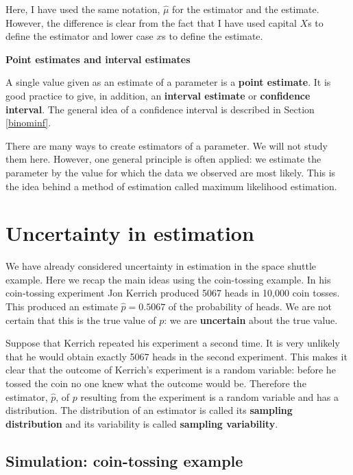 \documentclass[
  british,
  11pt,
  openany, a4paper]{book}
\begin{document}
Here, I have used the same notation, \(\hat{\mu}\) for the estimator and the estimate. However, the difference is clear from the fact that I have used capital \(X\)s to define the estimator and lower case \(x\)s to define the estimate.

\textbf{Point estimates and interval estimates}

A single value given as an estimate of a parameter is a \textbf{point estimate}. It is good practice to give, in addition, an \textbf{interval estimate} or \textbf{confidence interval}. The general idea of a confidence interval is described in Section \ref{binominf}.

There are many ways to create estimators of a parameter. We will not study them here. However, one general principle is often applied: we estimate the parameter by the value for which the data we observed are most likely. This is the idea behind a method of estimation called maximum likelihood estimation.

\section{Uncertainty in estimation}\label{uncertainty-in-estimation}

We have already considered uncertainty in estimation in the space shuttle example. Here we recap the main ideas using the coin-tossing example. In his coin-tossing experiment Jon Kerrich produced 5067 heads in 10,000 coin tosses. This produced an estimate \(\hat{p}=0.5067\) of the probability of heads. We are not certain that this is the true value of \(p\): we are \textbf{uncertain} about the true value.

Suppose that Kerrich repeated his experiment a second time. It is very unlikely that he would obtain exactly 5067 heads in the second experiment. This makes it clear that the outcome of Kerrich's experiment is a random variable: before he tossed the coin no one knew what the outcome would be. Therefore the estimator, \(\hat{p}\), of \(p\) resulting from the experiment is a random variable and has a distribution. The distribution of an estimator is called its \textbf{sampling distribution} and its variability is called \textbf{sampling variability}.

\subsection{Simulation: coin-tossing example}\label{simulation-coin-tossing-example}
\end{document}
